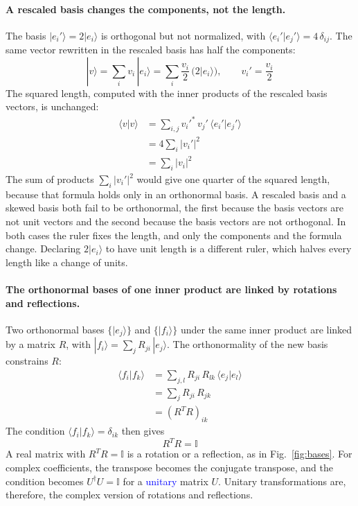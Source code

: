 \paragraph{A rescaled basis changes the components, not the length.} The basis $|e_i'\rangle = 2|e_i\rangle$ is orthogonal but not normalized, with $\langle e_i' | e_j' \rangle = 4\,\delta_{ij}$. The same vector rewritten in the rescaled basis has half the components:
\begin{equation*}
    |v\rangle = \sum_i v_i\, |e_i\rangle = \sum_i \frac{v_i}{2}\, \bigl(2|e_i\rangle\bigr), \qquad v_i' = \frac{v_i}{2}
\end{equation*}
The squared length, computed with the inner products of the rescaled basis vectors, is unchanged:
\begin{align*}
    \langle v | v \rangle &= \sum_{i,j} v_i'^{*}\, v_j'\, \langle e_i' | e_j' \rangle \\
    &= 4 \sum_i |v_i'|^2 \\
    &= \sum_i |v_i|^2
\end{align*}
The sum of products $\sum_i |v_i'|^2$ would give one quarter of the squared length, because that formula holds only in an orthonormal basis. A rescaled basis and a skewed basis both fail to be orthonormal, the first because the basis vectors are not unit vectors and the second because the basis vectors are not orthogonal. In both cases the ruler fixes the length, and only the components and the formula change. Declaring $2|e_i\rangle$ to have unit length is a different ruler, which halves every length like a change of units.

\paragraph{The orthonormal bases of one inner product are linked by rotations and reflections.} Two orthonormal bases $\{|e_j\rangle\}$ and $\{|f_i\rangle\}$ under the same inner product are linked by a matrix $R$, with $|f_i\rangle = \sum_j R_{ji}\, |e_j\rangle$. The orthonormality of the new basis constrains $R$:
\begin{align*}
    \langle f_i | f_k \rangle &= \sum_{j,l} R_{ji}\, R_{lk}\, \langle e_j | e_l \rangle \\
    &= \sum_{j} R_{ji}\, R_{jk} \\
    &= (R^{T} R)_{ik}
\end{align*}
The condition $\langle f_i | f_k \rangle = \delta_{ik}$ then gives
\begin{equation}
    \boxed{R^{T} R = \mathbb{I}}
\end{equation}
A real matrix with $R^{T} R = \mathbb{I}$ is a rotation or a reflection, as in Fig.~\ref{fig:bases}. For complex coefficients, the transpose becomes the conjugate transpose, and the condition becomes $U^{\dagger} U = \mathbb{I}$ for a \textcolor{blue}{unitary} matrix $U$. Unitary transformations are, therefore, the complex version of rotations and reflections.


